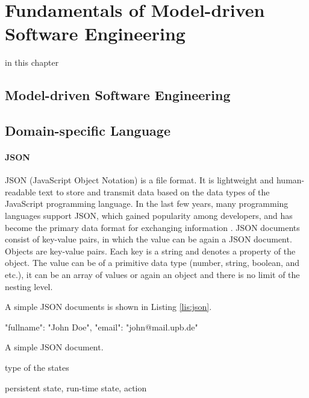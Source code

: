 \chapter{Fundamentals of Model-driven Software Engineering}
\label{ch:fundamentals}

in this chapter
\section{Model-driven Software Engineering}

\section{Domain-specific Language}
\subsubsection{JSON}
JSON (JavaScript Object Notation) is a file format. It is lightweight and human-readable text to store and transmit data based on the data types of the JavaScript programming language. In the last few years, many programming languages support JSON, which gained popularity among developers, and has become the primary data format for exchanging information \cite{json-schema}. JSON documents consist of key-value pairs, in which the value can be again a JSON document. Objects are key-value pairs. Each key is a string and denotes a property of the object. The value can be of a primitive data type (number, string, boolean, and etc.), it can be an array of values or again an object and there is no limit of the nesting level. 

A simple JSON documents is shown in Listing \ref{lis:json}.

\FloatBarrier
\begin{code}
\begin{json}
{
    "fullname": "John Doe",
    "email": "john@mail.upb.de"
}
\end{json}
\caption{A simple JSON document.}
\label{lis:json}
\end{code}
\FloatBarrier





type of the states

persistent state, run-time state, action